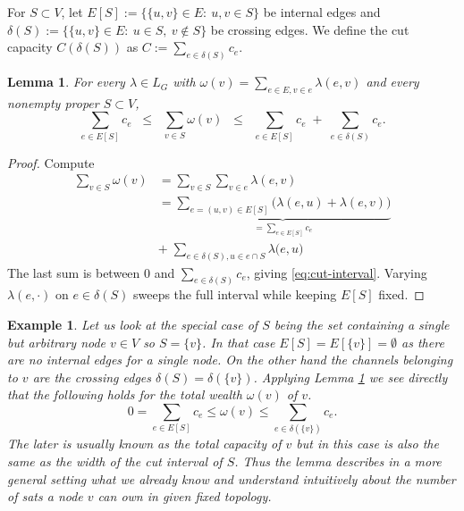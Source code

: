 \documentclass[10pt,twocolumn]{article}
\newtheorem{example}{Example}[theorem]
\newtheorem{lemma}[theorem]{Lemma}
\begin{document}
For $S\subset V$, let $E[S]:=\{\{u,v\}\in E:\ u,v\in S\}$ be internal edges and
$\delta(S):=\{\{u,v\}\in E:\ u\in S,\ v\notin S\}$ be crossing edges. We define the cut capacity
$C(\delta(S))$ as $C:=\sum_{e\in\delta(S)} c_e$.

\begin{lemma}
\label{lem:cut-interval}
For every $\lambda\in L_G$ with $\omega(v) = \sum_{e\in E,v\in e}\lambda(e,v)$ and every nonempty proper $S\subset V$,
\begin{equation}
\label{eq:cut-interval}
\sum_{e\in E[S]} c_e \;\;\le\;\; \sum_{v\in S}\omega(v) \;\;\le\;\; \sum_{e\in E[S]} c_e \;+\; \sum_{e\in \delta(S)} c_e.
\end{equation}
\end{lemma}

\begin{proof}
Compute
\begin{equation}
  \begin{split}
\sum_{v\in S}\omega(v) & =\sum_{v\in S}\sum_{v\in e}\lambda(e,v) \\
& =\underbrace{\sum_{e=(u,v)\in E[S]}\big(\lambda(e,u)+\lambda(e,v)\big)}_{=\sum_{e\in E[S]}c_e} \\
& +
\;\sum_{e\in\delta(S),u\in e\cap S}\lambda\big(e,u)
\end{split}
  \end{equation}
The last sum is between $0$ and $\sum_{e\in\delta(S)}c_e$, giving \eqref{eq:cut-interval}. Varying $\lambda(e,\cdot)$ on
$e\in\delta(S)$ sweeps the full interval while keeping $E[S]$ fixed.
\end{proof}

\begin{example}
  Let us look at the special case of $S$ being the set containing a single but arbitrary node $v\in V$ so $S=\{v\}$. In that case $E[S] = E[\{v\}]  = \emptyset$ as there are no internal edges for a single node. On the other hand the channels belonging to $v$ are the crossing edges $\delta(S) = \delta(\{v\})$. Applying Lemma \ref{lem:cut-interval} we see directly that the following holds for the total wealth $\omega(v)$ of $v$.
  \begin{equation}
    0 = \sum_{e\in E[S]}c_e \leq \omega(v) \leq \sum_{e\in\delta(\{v\})}c_e.
    \end{equation}
  The later is usually known as the total capacity of $v$ but in this case is also the same as the width of the cut interval of $S$. Thus the lemma describes in a more general setting what we already know and understand intuitively about the number of sats a node $v$ can own in given fixed topology.
  \end{example}
\end{document}
